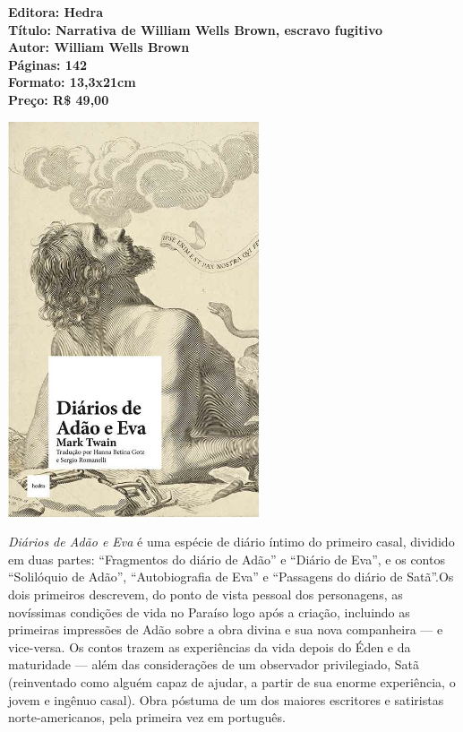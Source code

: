 \vfill

\noindent\begin{minipage}[c]{.5\linewidth}
{\small\textbf{
\hspace*{-.1cm}Editora: Hedra\\
Título: Narrativa de William Wells Brown, escravo fugitivo\\
Autor: William Wells Brown\\ 
Páginas: 142\\
Formato: 13,3x21cm\\
Preço: R\$ 49,00\\
}}
\end{minipage}

\pagebreak

\begin{center}
\hspace*{-3.6cm}
\hspace*{3.1cm}\includegraphics[width=74mm]{./grid/diario.jpeg}
\end{center}

\hspace*{-7cm}\hrulefill\hspace*{-7cm}

\medskip

\noindent{}\textit{Diários de Adão e Eva} é uma espécie de diário íntimo do primeiro casal, dividido em duas partes: ``Fragmentos do diário de Adão'' e ``Diário de Eva'', e os contos ``Solilóquio de Adão'', ``Autobiografia de Eva'' e ``Passagens do diário de Satã''.Os dois primeiros descrevem, do ponto de vista pessoal dos personagens, as novíssimas condições de vida no Paraíso logo após a criação, incluindo as primeiras impressões de Adão sobre a obra divina e sua nova companheira — e vice-versa. Os contos trazem as experiências da vida depois do Éden e da maturidade — além das considerações de um observador privilegiado, Satã (reinventado como alguém capaz de ajudar, a partir de sua enorme experiência, o jovem e ingênuo casal). Obra póstuma de um dos maiores escritores e satiristas norte-americanos, pela primeira vez em português.

